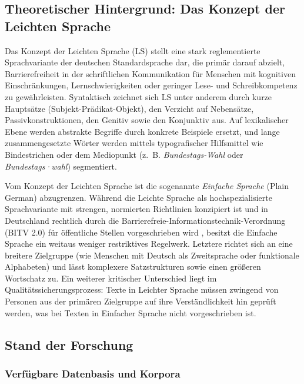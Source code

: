 \subsection{Theoretischer Hintergrund: Das Konzept der Leichten Sprache}
\label{sec:konzept_leichte_sprache}

Das Konzept der Leichten Sprache (LS) stellt eine stark reglementierte Sprachvariante der deutschen Standardsprache dar, die primär darauf abzielt, Barrierefreiheit in der schriftlichen Kommunikation für Menschen mit kognitiven Einschränkungen, Lernschwierigkeiten oder geringer Lese- und Schreibkompetenz zu gewährleisten. Syntaktisch zeichnet sich LS unter anderem durch kurze Hauptsätze (Subjekt-Prädikat-Objekt), den Verzicht auf Nebensätze, Passivkonstruktionen, den Genitiv sowie den Konjunktiv aus. Auf lexikalischer Ebene werden abstrakte Begriffe durch konkrete Beispiele ersetzt, und lange zusammengesetzte Wörter werden mittels typografischer Hilfsmittel wie Bindestrichen oder dem Mediopunkt (z.~B. \textit{Bundestags-Wahl} oder \textit{Bundestags·wahl}) segmentiert. 

Vom Konzept der Leichten Sprache ist die sogenannte \textit{Einfache Sprache} (Plain German) abzugrenzen. Während die Leichte Sprache als hochspezialisierte Sprachvariante mit strengen, normierten Richtlinien konzipiert ist und in Deutschland rechtlich durch die Barrierefreie-Informationstechnik-Verordnung (BITV 2.0) für öffentliche Stellen vorgeschrieben wird \citep{bund2026barrierefreiheit}, besitzt die Einfache Sprache ein weitaus weniger restriktives Regelwerk. Letztere richtet sich an eine breitere Zielgruppe (wie Menschen mit Deutsch als Zweitsprache oder funktionale Alphabeten) und lässt komplexere Satzstrukturen sowie einen größeren Wortschatz zu. Ein weiterer kritischer Unterschied liegt im Qualitätssicherungsprozess: Texte in Leichter Sprache müssen zwingend von Personen aus der primären Zielgruppe auf ihre Verständlichkeit hin geprüft werden, was bei Texten in Einfacher Sprache nicht vorgeschrieben ist.


\subsection{Stand der Forschung}
\label{sec:stand_der_forschung}

\subsubsection{Verfügbare Datenbasis und Korpora}
\label{sec:datenbasis_korpora}

